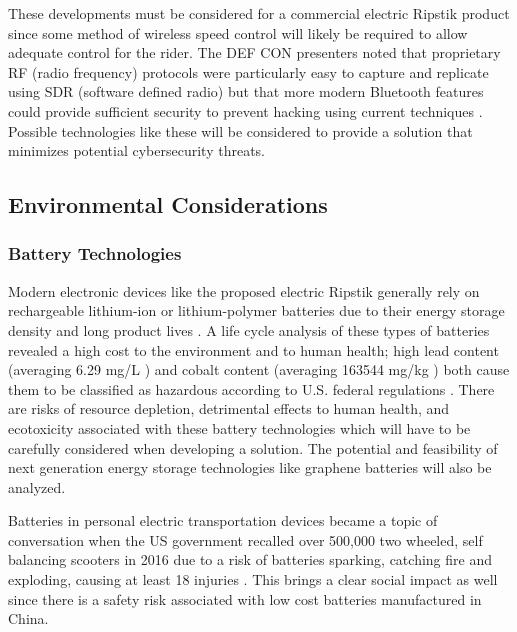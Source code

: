 These developments must be considered for a commercial electric Ripstik product since some method of wireless speed control will likely be required to allow adequate control for the rider. The DEF CON presenters noted that proprietary RF (radio frequency) protocols were particularly easy to capture and replicate using SDR (software defined radio) \cite{Radio}\cite{DEFCON} but that more modern Bluetooth features could provide sufficient security to prevent hacking using current techniques \cite{DEFCON}. Possible technologies like these will be considered to provide a solution that minimizes potential cybersecurity threats.
\subsection{Environmental Considerations}
\subsubsection{Battery Technologies}
Modern electronic devices like the proposed electric Ripstik generally rely on rechargeable lithium-ion or lithium-polymer batteries due to their energy storage density and long product lives \cite{BatteryRecharge}. A life cycle analysis of these types of batteries revealed a high cost to the environment and to human health; high lead content (averaging 6.29 mg/L \cite{BatteryRecharge}) and cobalt content (averaging 163544 mg/kg \cite{BatteryRecharge}) both cause them to be classified as hazardous according to U.S. federal regulations \cite{BatteryRecharge}. There are risks of  resource depletion, detrimental effects to human health, and ecotoxicity associated with these battery technologies \cite{BatteryRecharge} which will have to be carefully considered when developing a solution. The potential and feasibility of next generation energy storage technologies like graphene batteries \cite{Graphene} will also be analyzed.

Batteries in personal electric transportation devices became a topic of conversation when the US government recalled over 500,000 two wheeled, self balancing scooters in 2016 due to a risk of batteries sparking, catching fire and exploding, causing at least 18 injuries \cite{CBCArticle}. This brings a clear social impact as well since there is a safety risk associated with low cost batteries manufactured in China\cite{CBCArticle}.
